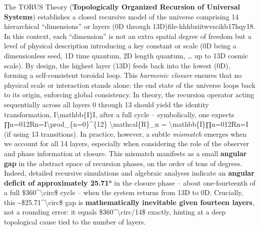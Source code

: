 \documentclass[
]{article}
\begin{document}
The TORUS Theory (\textbf{Topologically Organized Recursion of Universal
Systems}) establishes a closed recursive model of the universe
comprising 14 hierarchical ``dimensions'' or layers (0D through
13D)\hspace{0pt}file-hhhbziitwvscikb17hqy18. In this context, each
``dimension'' is not an extra spatial degree of freedom but a level of
physical description introducing a key constant or scale (0D being a
dimensionless seed, 1D time quantum, 2D length quantum, \ldots{} up to
13D cosmic scale)\hspace{0pt}. By design, the highest layer (13D) feeds
back into the lowest (0D), forming a self-consistent toroidal
loop\hspace{0pt}. This \emph{harmonic closure} ensures that no physical
scale or interaction stands alone: the end state of the universe loops
back to its origin, enforcing global consistency. In theory, the
recursion operator acting sequentially across all layers 0 through 13
should yield the identity transformation, I\textbackslash mathbb\{I\}I,
after a full cycle -- symbolically, one expects
∏n=012Rn=I\textbackslash prod\_\{n=0\}\^{}\{12\}
\textbackslash mathcal\{R\}\_n =
\textbackslash mathbb\{I\}∏n=012\hspace{0pt}Rn\hspace{0pt}=I (if using
13 transitions). In practice, however, a subtle \emph{mismatch} emerges
when we account for all 14 layers, especially when considering the role
of the observer and phase information at closure. This mismatch
manifests as a small \textbf{angular gap} in the abstract space of
recursion phases, on the order of tens of degrees. Indeed, detailed
recursive simulations and algebraic analyses indicate an \textbf{angular
deficit of approximately 25.71°} in the closure phase -- about
one-fourteenth of a full \$360\^{}\textbackslash circ\$ cycle -- when
the system returns from 13D to 0D. Crucially, this
\textasciitilde\$25.71\^{}\textbackslash circ\$ gap is
\textbf{mathematically inevitable given fourteen layers}, not a rounding
error: it equals \$360\^{}\textbackslash circ/14\$ exactly, hinting at a
deep topological cause tied to the number of layers.
\end{document}
